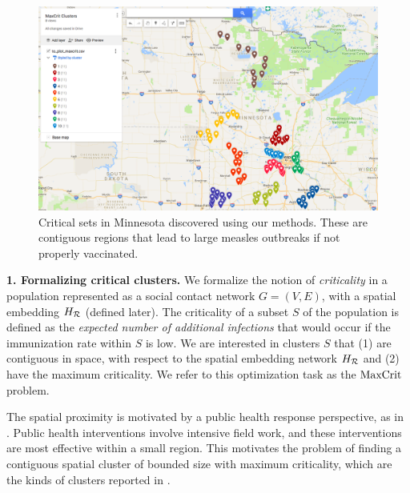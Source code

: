 \begin{figure}
\centering
\includegraphics[width=.45\textwidth]{img/maxcrit_clusters.png}
\caption{Critical sets in Minnesota discovered using our methods. These are contiguous regions that lead to large measles outbreaks if not properly vaccinated.
\vspace*{-0.15in}
}
\label{fig:mn-criticalsets}
\end{figure}
%
\noindent
\textbf{1. Formalizing critical clusters.}
We formalize the notion of \emph{criticality} in a population represented as a social contact network $G=(V, E)$, with a spatial embedding $H_{\mathcal{R}}$ (defined later). The criticality of a subset $S$ of the population is defined as the \emph{expected number of additional infections} that would occur if the immunization rate within $S$ is low. We are interested in clusters $S$ that (1) are contiguous in space, with respect to the spatial embedding network $H_{\mathcal{R}}$ and (2) have the maximum criticality. We refer to this optimization task as the $\text{MaxCrit}{}$ problem. 

The spatial proximity is motivated by a public health response perspective, as in \cite{lieu2015geographic,atwell:pediatrics13,cadena:vacc-cluster}. Public health interventions involve intensive field work, and these interventions are most effective within a small region. This motivates the problem of finding a contiguous spatial cluster of bounded size with maximum criticality,
which are the kinds of clusters reported in \cite{cadena:vacc-cluster}.



